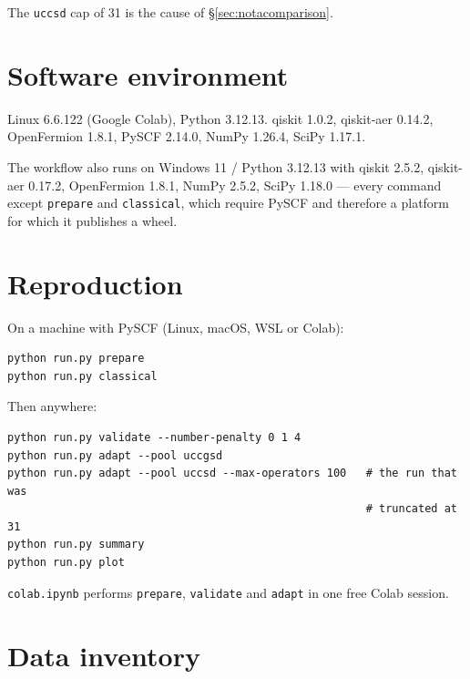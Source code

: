 \documentclass[11pt,a4paper]{article}
\newcommand{\code}[1]{\texttt{\small #1}}
\begin{document}
The \code{uccsd} cap of 31 is the cause of \S\ref{sec:notacomparison}.

\section{Software environment}

Linux 6.6.122 (Google Colab), Python 3.12.13. qiskit 1.0.2, qiskit-aer 0.14.2,
OpenFermion 1.8.1, PySCF 2.14.0, NumPy 1.26.4, SciPy 1.17.1.

The workflow also runs on Windows 11 / Python 3.12.13 with qiskit 2.5.2,
qiskit-aer 0.17.2, OpenFermion 1.8.1, NumPy 2.5.2, SciPy 1.18.0 --- every
command except \code{prepare} and \code{classical}, which require PySCF and
therefore a platform for which it publishes a wheel.

\section{Reproduction}

On a machine with PySCF (Linux, macOS, WSL or Colab):

\begin{verbatim}
python run.py prepare
python run.py classical
\end{verbatim}

Then anywhere:

\begin{verbatim}
python run.py validate --number-penalty 0 1 4
python run.py adapt --pool uccgsd
python run.py adapt --pool uccsd --max-operators 100   # the run that was
                                                       # truncated at 31
python run.py summary
python run.py plot
\end{verbatim}

\code{colab.ipynb} performs \code{prepare}, \code{validate} and \code{adapt} in
one free Colab session.

\section{Data inventory}
\end{document}
